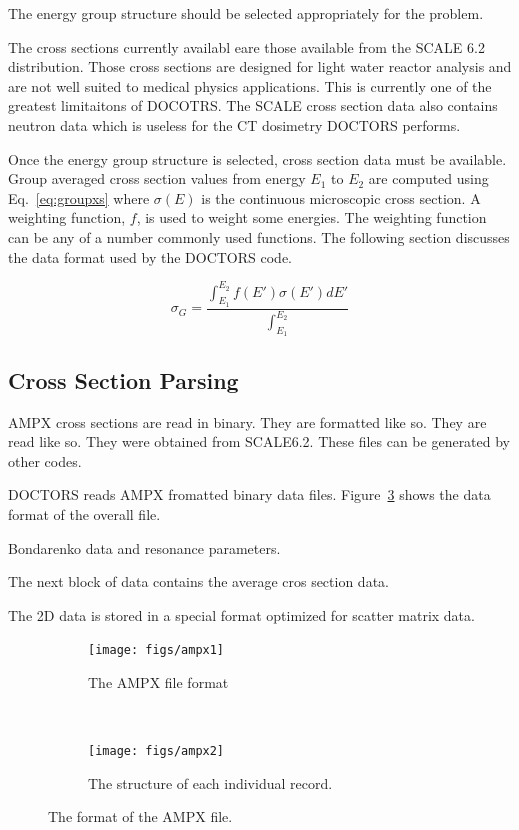 The energy group structure should be selected appropriately for the problem.

The cross sections currently availabl eare those available from the SCALE 6.2 distribution. Those cross sections are designed for light water reactor analysis and are not well suited to medical physics applications. This is currently one of the greatest limitaitons of DOCOTRS. The SCALE cross section data also contains neutron data which is useless for the CT dosimetry DOCTORS performs.

Once the energy group structure is selected, cross section data must be available. Group averaged cross section values from energy $E_1$ to $E_2$ are computed using Eq.~\ref{eq:groupxs} where $\sigma(E)$ is the continuous microscopic cross section. A weighting function, $f$, is used to weight some energies. The weighting function can be any of a number commonly used functions. The following section discusses the data format used by the DOCTORS code.

\begin{equation}\label{eq:groupxs}
\sigma_G = \frac{\int_{E_1}^{E_2}f(E')\sigma(E') dE'}{\int_{E_1}^{E_2}}
\end{equation}

\subsection{Cross Section Parsing}
AMPX cross sections are read in binary. They are formatted like so. They are read like so. They were obtained from SCALE6.2. These files can be generated by other codes.

DOCTORS reads AMPX fromatted binary data files. Figure~\ref{fig:ampx} shows the data format of the overall file.

Bondarenko data and resonance parameters.

The next block of data contains the average cros section data.

The 2D data is stored in a special format optimized for scatter matrix data.

\begin{figure}
    \centering
    \begin{subfigure}[b]{0.45\textwidth}
        \texttt{[image: figs/ampx1]}
        \caption{The AMPX file format}
        \label{fig:ampx1}
    \end{subfigure}
    ~
    \begin{subfigure}[b]{0.45\textwidth}
        \texttt{[image: figs/ampx2]}
        \caption{The structure of each individual record.}
        \label{fig:ampx2}
    \end{subfigure}
    \caption{The format of the AMPX file.}\label{fig:ampx}
\end{figure}

